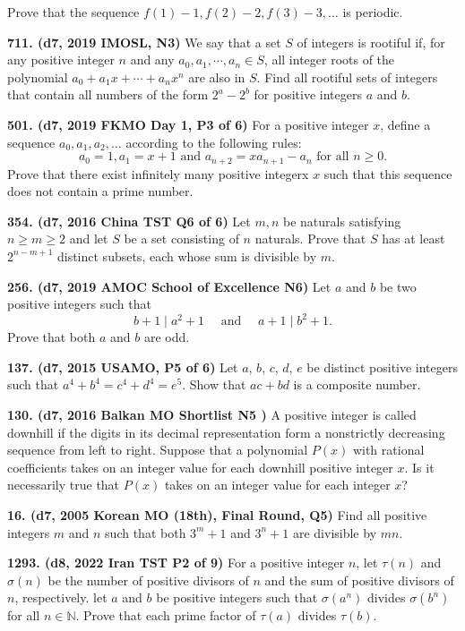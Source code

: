 \documentclass{article}
\begin{document}
Prove that the sequence $f(1) - 1, f(2) - 2, f(3) - 3, \ldots$ is periodic.

\textbf{711. (\color{red}d7\color{black}, 2019 IMOSL, N3)} We say that a set $S$ of integers is rootiful if, for any positive integer $n$ and any $a_0, a_1, \cdots, a_n \in S$, all integer roots of the polynomial $a_0+a_1x+\cdots+a_nx^n$ are also in $S$. Find all rootiful sets of integers that contain all numbers of the form $2^a - 2^b$ for positive integers $a$ and $b$.

\textbf{501. (\color{red}d7\color{black}, 2019 FKMO Day 1, P3 of 6)} For a positive integer $x$, define a sequence $a_0, a_1, a_2, \dots$ according to the following rules: \[a_0 = 1, a_1 = x+1 \text{ and } a_{n+2} = xa_{n+1} - a_n \text{ for all } n \geq 0.\] Prove that there exist infinitely many positive integerx $x$ such that this sequence does not contain a prime number.

\textbf{354. (\color{red}d7\color{black}, 2016 China TST Q6 of 6)} Let $m, n$ be naturals satisfying $n \geq m \geq 2$ and let $S$ be a set consisting of $n$ naturals. Prove that $S$ has at least $2^{n - m + 1}$ distinct subsets, each whose sum is divisible by $m.$

\textbf{256. (\color{red}d7\color{black}, 2019 AMOC School of Excellence N6)} Let \(a\) and \(b\) be two positive integers such that \[b+1 \mid a^2 + 1 \quad \text{ and } \quad a+1 \mid b^2 + 1.\] Prove that both \(a\) and \(b\) are odd.

\textbf{137. (\color{red}d7\color{black}, 2015 USAMO, P5 of 6)} Let $a$, $b$, $c$, $d$, $e$ be distinct positive integers such that $a^4+b^4=c^4+d^4=e^5$. Show that $ac+bd$ is a composite number.

\textbf{130. (\color{red}d7\color{black}, 2016 Balkan MO Shortlist N5       )} A positive integer is called downhill if the digits in its decimal representation form a nonstrictly decreasing sequence from left to right. Suppose that a polynomial $P(x)$ with rational coefficients takes on an integer value for each downhill positive integer $x$. Is it necessarily true that $P(x)$ takes on an integer value for each integer $x$?

\textbf{16. (\color{red}d7\color{black}, 2005 Korean MO (18th), Final Round, Q5)} Find all positive integers $m$ and $n$ such that both $3^m +1$ and $3^n +1$ are divisible by $mn$.

\textbf{1293. (\color{red}d8\color{black}, 2022 Iran TST P2 of 9)} For a positive integer $n$, let $\tau(n)$ and $\sigma(n)$ be the number of positive divisors of $n$ and the sum of positive divisors of $n$, respectively. let $a$ and $b$ be positive integers such that $\sigma(a^n)$ divides $\sigma(b^n)$ for all $n\in \mathbb{N}$. Prove that each prime factor of $\tau(a)$ divides $\tau(b)$.
\end{document}
